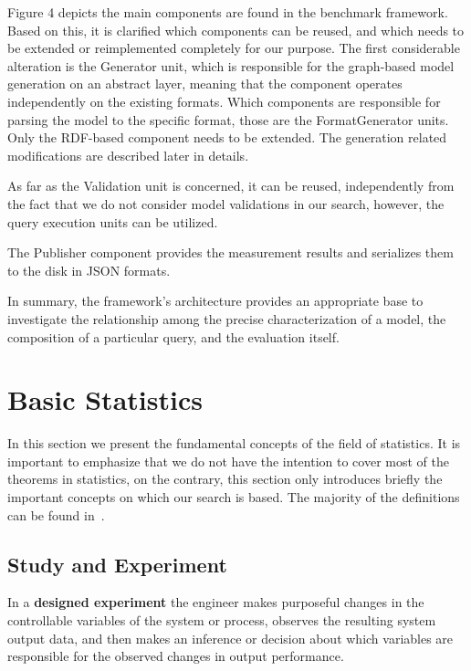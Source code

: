 Figure 4 depicts the main components are found in the benchmark framework. Based on this, it is clarified which components can be reused, and which needs to be extended or reimplemented completely for our purpose. The first considerable alteration is the \textsf{Generator} unit, which is responsible for the graph-based model generation on an abstract layer, meaning that the component operates independently on the existing formats. Which components are responsible for parsing the model to the specific format, those are the \textsf{FormatGenerator} units. Only the RDF-based component needs to be extended. The generation related modifications are described later in details.

As far as the \textsf{Validation} unit is concerned, it can be reused, independently from the fact that we do not consider model validations in our search, however, the query execution units can be utilized.

The \textsf{Publisher} component provides the measurement results and serializes them to the disk in JSON formats.

In summary, the framework's architecture provides an appropriate base to investigate the relationship among the precise characterization of a model, the composition of a particular query, and the evaluation itself.

\section{Basic Statistics} \label{section:distributions}
In this section we present the fundamental concepts of the field of statistics. It is important to emphasize that we do not have the intention to cover most of the theorems in statistics, on the contrary, this section only introduces briefly the important concepts on which our search is based. The majority of the definitions can be found in~\cite{statistics_book}.

\subsection{Study and Experiment}

In a \textbf{designed experiment} the engineer makes purposeful changes in the controllable
variables of the system or process, observes the resulting system output data, and then
makes an inference or decision about which variables are responsible for the observed changes
in output performance. 

